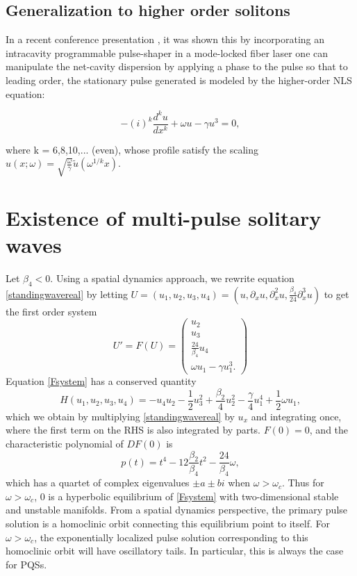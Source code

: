 \documentclass[12pt]{article}
\begin{document}
\subsection{Generalization to higher order solitons}
In a recent conference presentation \cite{Runge2020}, it was shown this by  incorporating an intracavity programmable pulse-shaper in a mode-locked fiber laser one can manipulate the net-cavity dispersion by applying a phase to the pulse so that to leading order, the stationary pulse generated is modeled by the higher-order NLS equation:

\begin{equation}\label{HONLS}
-(i)^k\frac{d^k u}{dx^k}+ \omega u - \gamma u^3 = 0,
\end{equation}

\noindent
where k = 6,8,10,... (even), whose profile satisfy the scaling 
$u(x; \omega) = \sqrt{\frac{\omega}{\gamma}}\tilde{u}
(\omega^{1/k}x)$.

\section{Existence of multi-pulse solitary waves}

Let $\beta_4 < 0$. Using a spatial dynamics approach, we rewrite equation \cref{standingwavereal} by letting $U = (u_1, u_2, u_3, u_4) = (u, \partial_x u, \partial_x^2 u, \frac{\beta_4}{24} \partial_x^3 u)$ to get the first order system
\begin{equation}\label{Fsystem}
U' = F(U) = \begin{pmatrix}
u_2 \\ u_3 \\ \frac{24}{\beta_4} u_4 \\ \omega u_1 - \gamma u_1^3.
\end{pmatrix}
\end{equation}
Equation \cref{Fsystem} has a conserved quantity
\begin{equation}\label{FsystemH}
H(u_1, u_2, u_3, u_4) = -u_4 u_2 - \frac{1}{2} u_3^2 + \frac{\beta_2}{4}u_2^2 - \frac{\gamma}{4} u_1^4 + \frac{1}{2}\omega u_1,
\end{equation}
which we obtain by multiplying \cref{standingwavereal} by $u_x$ and integrating once, where the first term on the RHS is also integrated by parts. $F(0) = 0$, and the characteristic polynomial of $DF(0)$ is
\[
p(t) = t^4 - 12\frac{\beta_2}{\beta_4} t^2 - \frac{24}{\beta_4}\omega,
\]
which has a quartet of complex eigenvalues $\pm a \pm b i$ when $\omega > \omega_c$. Thus for $\omega > \omega_c$, 0 is a hyperbolic equilibrium of \cref{Fsystem} with two-dimensional stable and unstable manifolds. From a spatial dynamics perspective, the primary pulse solution is a homoclinic orbit connecting this equilibrium point to itself.  For $\omega > \omega_c$, the exponentially localized pulse solution corresponding to this homoclinic orbit will have oscillatory tails. In particular, this is always the case for PQSs. 
\end{document}
